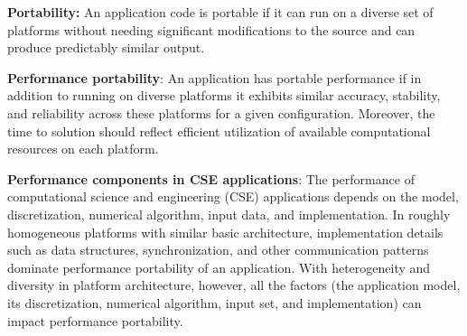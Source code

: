 \documentclass[]{article}
\date{}
\begin{document}
\pagestyle{fancy}
\renewcommand{\headrulewidth}{0pt}
  
\thispagestyle{empty}
\textbf{\newline}
\textbf{\newline}
\textbf{\newline}

\textbf{Portability:} An application code is portable if it can run on a
diverse set of platforms without needing significant modifications to
the source and can produce predictably similar output.

\textbf{Performance portability}: An application has portable
performance if in addition to running on diverse platforms it exhibits
similar accuracy, stability, and reliability across these platforms for
a given configuration. Moreover, the time to solution should reflect
efficient utilization of available computational resources on each
platform.

\textbf{Performance components in CSE applications}: The performance
of computational science and engineering (CSE) applications depends on
the model, discretization, numerical algorithm, input data, and
implementation. In roughly homogeneous platforms with similar basic
architecture, implementation details such as data structures,
synchronization, and other communication patterns dominate performance
portability of an application. With heterogeneity and diversity in
platform architecture, however, all the factors (the application model,
its discretization, numerical algorithm, input set, and implementation)
can impact performance portability.
\end{document}
